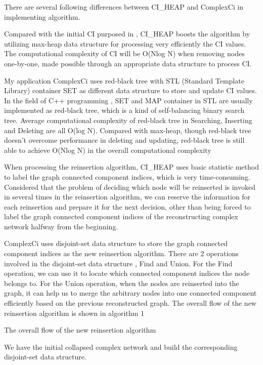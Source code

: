 \documentclass{article}
\begin{document}
	There are several following differences between CI\_HEAP and ComplexCi in implementing algorithm.
	
	\begin{enumerate}
	\begin{item}
		Compared with the initial CI purposed in \cite{morone2015influence}, CI\_HEAP boosts the algorithm by utilizing max-heap data structure for processing very efficiently the CI values. The computational complexity of CI will be O(Nlog N) when removing nodes one-by-one, made possible through an appropriate data structure to process CI. 
		
		My application ComplexCi uses red-black tree with STL (Standard Template Library) container SET as different data structure to store and update CI values. In the field of C++ programming , SET and MAP container in STL are usually implemented as red-black tree, which is a kind of self-balancing binary search tree. Average computational complexity of red-black tree in Searching, Inserting and Deleting are all O(log N). Compared with max-heap, though red-black tree doesn’t overcome performance in deleting and updating, red-black tree is still able to achieve O(Nlog N) in the overall computational complexity 
	\end{item}
	\begin{item}
		When processing the reinsertion algorithm, CI\_HEAP uses basic statistic method to label the graph connected component indices, which is very time-consuming. Considered that the problem of deciding which node will be reinserted is invoked in several times in the reinsertion algorithm, we can reserve the information for each reinsertion and prepare it for the next decision, other than being forced to label the graph connected component indices of the reconstructing complex network halfway from the beginning.
		
		ComplexCi uses disjoint-set data structure to store the graph connected component indices as the new reinsertion algorithm. There are 2 operations involved in the disjoint-set data structure , Find and Union. For the Find operation, we can use it to locate which connected component indices the node belongs to. For the Union operation, when the nodes are reinserted into the graph, it can help us to merge the arbitrary nodes into one connected component efficiently based on the previous reconstructed graph. The overall flow of the new reinsertion algorithm is shown in algorithm 1

		\begin{algorithm}[htb]
		\caption{ The overall flow of the new reinsertion algorithm }
		\begin{algorithmic}[1]
			\State We have the initial collapsed complex network and build the corresponding disjoint-set data structure.
			

\end{algorithmic}
\end{algorithm}
\end{item}
\end{enumerate}
\end{document}
